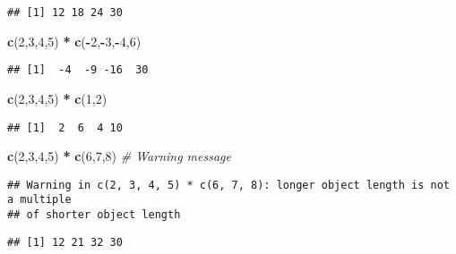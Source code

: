 \documentclass[
]{article}
\newenvironment{Shaded}{\begin{snugshade}}{\end{snugshade}}
\newcommand{\CommentTok}[1]{\textcolor[rgb]{0.56,0.35,0.01}{\textit{#1}}}
\newcommand{\DecValTok}[1]{\textcolor[rgb]{0.00,0.00,0.81}{#1}}
\newcommand{\FunctionTok}[1]{\textcolor[rgb]{0.13,0.29,0.53}{\textbf{#1}}}
\newcommand{\NormalTok}[1]{#1}
\newcommand{\SpecialCharTok}[1]{\textcolor[rgb]{0.81,0.36,0.00}{\textbf{#1}}}
\begin{document}
\begin{verbatim}
## [1] 12 18 24 30
\end{verbatim}

\begin{Shaded}
\begin{Highlighting}[]
\FunctionTok{c}\NormalTok{(}\DecValTok{2}\NormalTok{,}\DecValTok{3}\NormalTok{,}\DecValTok{4}\NormalTok{,}\DecValTok{5}\NormalTok{) }\SpecialCharTok{*} \FunctionTok{c}\NormalTok{(}\SpecialCharTok{{-}}\DecValTok{2}\NormalTok{,}\SpecialCharTok{{-}}\DecValTok{3}\NormalTok{,}\SpecialCharTok{{-}}\DecValTok{4}\NormalTok{,}\DecValTok{6}\NormalTok{)}
\end{Highlighting}
\end{Shaded}

\begin{verbatim}
## [1]  -4  -9 -16  30
\end{verbatim}

\begin{Shaded}
\begin{Highlighting}[]
\FunctionTok{c}\NormalTok{(}\DecValTok{2}\NormalTok{,}\DecValTok{3}\NormalTok{,}\DecValTok{4}\NormalTok{,}\DecValTok{5}\NormalTok{) }\SpecialCharTok{*} \FunctionTok{c}\NormalTok{(}\DecValTok{1}\NormalTok{,}\DecValTok{2}\NormalTok{)}
\end{Highlighting}
\end{Shaded}

\begin{verbatim}
## [1]  2  6  4 10
\end{verbatim}

\begin{Shaded}
\begin{Highlighting}[]
 \FunctionTok{c}\NormalTok{(}\DecValTok{2}\NormalTok{,}\DecValTok{3}\NormalTok{,}\DecValTok{4}\NormalTok{,}\DecValTok{5}\NormalTok{) }\SpecialCharTok{*} \FunctionTok{c}\NormalTok{(}\DecValTok{6}\NormalTok{,}\DecValTok{7}\NormalTok{,}\DecValTok{8}\NormalTok{) }\CommentTok{\# Warning message}
\end{Highlighting}
\end{Shaded}

\begin{verbatim}
## Warning in c(2, 3, 4, 5) * c(6, 7, 8): longer object length is not a multiple
## of shorter object length
\end{verbatim}

\begin{verbatim}
## [1] 12 21 32 30
\end{verbatim}
\end{document}
